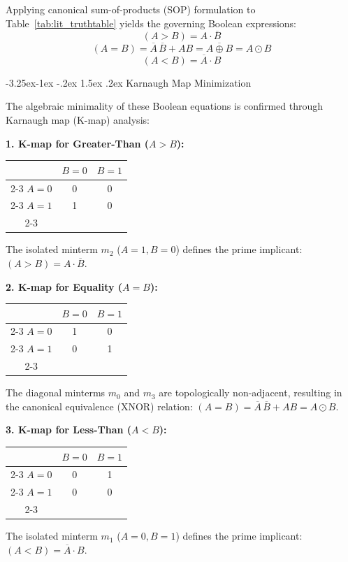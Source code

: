 \documentclass[12pt,a4paper,oneside]{report}
\makeatletter
\renewcommand\subsection{\@startsection{subsection}{2}{\z@}%
                                     {-3.25ex\@plus -1ex \@minus -.2ex}%
                                     {1.5ex \@plus .2ex}%
                                     {\normalfont\normalsize\bfseries\itshape}}
\makeatother
\begin{document}
Applying canonical sum-of-products (SOP) formulation to Table~\ref{tab:lit_truthtable} yields the governing Boolean expressions:
\begin{equation}
(A > B) = A \cdot \overline{B}
\label{eq:lit_agb}
\end{equation}
\begin{equation}
(A = B) = \overline{A}\,\overline{B} + A B = \overline{A \oplus B} = A \odot B
\label{eq:lit_aeb}
\end{equation}
\begin{equation}
(A < B) = \overline{A} \cdot B
\label{eq:lit_alb}
\end{equation}

\subsection{Karnaugh Map Minimization}

The algebraic minimality of these Boolean equations is confirmed through Karnaugh map (K-map) analysis:

\noindent\textbf{1. K-map for Greater-Than ($A > B$):}
\begin{center}
\begin{tabular}{c|c|c|}
\multicolumn{1}{c}{} & \multicolumn{1}{c}{$B=0$} & \multicolumn{1}{c}{$B=1$} \\
\cline{2-3}
$A=0$ & 0 & 0 \\
\cline{2-3}
$A=1$ & 1 & 0 \\
\cline{2-3}
\end{tabular}
\end{center}
The isolated minterm $m_2$ ($A=1, B=0$) defines the prime implicant: $(A > B) = A \cdot \overline{B}$.

\noindent\textbf{2. K-map for Equality ($A = B$):}
\begin{center}
\begin{tabular}{c|c|c|}
\multicolumn{1}{c}{} & \multicolumn{1}{c}{$B=0$} & \multicolumn{1}{c}{$B=1$} \\
\cline{2-3}
$A=0$ & 1 & 0 \\
\cline{2-3}
$A=1$ & 0 & 1 \\
\cline{2-3}
\end{tabular}
\end{center}
The diagonal minterms $m_0$ and $m_3$ are topologically non-adjacent, resulting in the canonical equivalence (XNOR) relation: $(A = B) = \overline{A}\,\overline{B} + AB = A \odot B$.

\noindent\textbf{3. K-map for Less-Than ($A < B$):}
\begin{center}
\begin{tabular}{c|c|c|}
\multicolumn{1}{c}{} & \multicolumn{1}{c}{$B=0$} & \multicolumn{1}{c}{$B=1$} \\
\cline{2-3}
$A=0$ & 0 & 1 \\
\cline{2-3}
$A=1$ & 0 & 0 \\
\cline{2-3}
\end{tabular}
\end{center}
The isolated minterm $m_1$ ($A=0, B=1$) defines the prime implicant: $(A < B) = \overline{A} \cdot B$.
\end{document}
